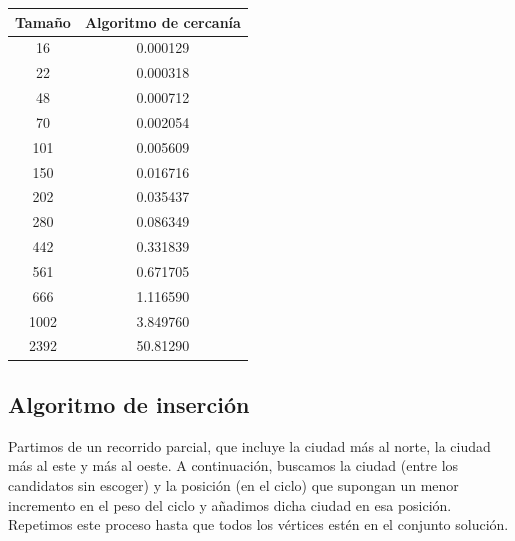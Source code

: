 \documentclass[a4]{article}
\begin{document}
\begin{tabular}{|c|c|} \hline
\textbf{Tamaño}& 
\textbf{Algoritmo de cercanía}
  \\ \hline
     16      & 0.000129  \\
     22      & 0.000318  \\
     48      & 0.000712  \\
     70      & 0.002054  \\
     101     & 0.005609            \\
     150     & 0.016716  \\
     202     & 0.035437  \\
     280     & 0.086349    \\
     442     & 0.331839    \\
     561     & 0.671705  \\
     666     & 1.116590       \\
     1002    & 3.849760  \\
     2392    & 50.81290   \\
\hline
\end{tabular}

\begin{figure}[H]
  \centering
{}
\end{figure}

\subsection{Algoritmo de inserción}

Partimos de un recorrido parcial, que incluye la ciudad más al norte,
la ciudad más al este y más al oeste. A continuación, buscamos la
ciudad (entre los candidatos sin escoger) y la posición (en el ciclo)
que supongan un menor incremento en el peso del ciclo y añadimos dicha
ciudad en esa posición. Repetimos este proceso hasta que todos los
vértices estén en el conjunto solución.
\end{document}
